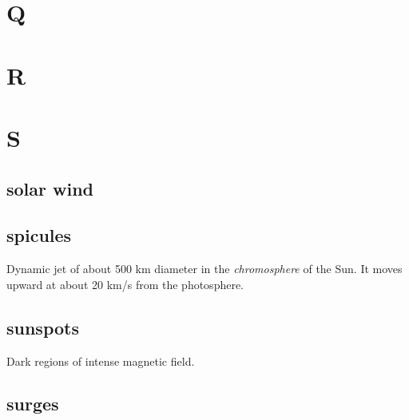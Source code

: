 \documentclass[12pt]{article}
\begin{document}
\section{Q}
\section{R}
\section{S}
\subsection*{solar wind}
\subsection*{spicules}
Dynamic jet of about 500 km diameter in the \emph{chromosphere} of the Sun.
It moves upward at about 20 km/s from the photosphere.

\subsection*{sunspots}
Dark regions of intense magnetic field.

\subsection*{surges}
\end{document}
